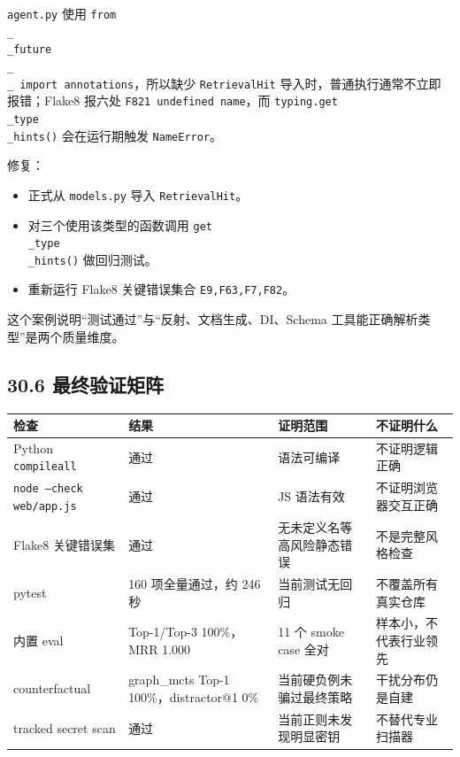 \documentclass[UTF8,12pt,openany]{ctexbook}
\begin{document}
\texttt{agent.py} 使用 \texttt{from \\_\\_future\\_\\_ import annotations}，所以缺少 \texttt{RetrievalHit} 导入时，普通执行通常不立即报错；Flake8 报六处 \texttt{F821 undefined name}，而 \texttt{typing.get\\_type\\_hints()} 会在运行期触发 \texttt{NameError}。\par

修复：\par

\begin{itemize}
\item 正式从 \texttt{models.py} 导入 \texttt{RetrievalHit}。
\item 对三个使用该类型的函数调用 \texttt{get\\_type\\_hints()} 做回归测试。
\item 重新运行 Flake8 关键错误集合 \texttt{E9,F63,F7,F82}。
\end{itemize}

这个案例说明“测试通过”与“反射、文档生成、DI、Schema 工具能正确解析类型”是两个质量维度。\par

\subsection{30.6 最终验证矩阵}

\begin{center}
\small
\begin{longtable}{|p{}|p{}|p{}|p{}|}
\toprule
检查 & 结果 & 证明范围 & 不证明什么 \\
\midrule
Python \texttt{compileall} & 通过 & 语法可编译 & 不证明逻辑正确 \\
\texttt{node --check web/app.js} & 通过 & JS 语法有效 & 不证明浏览器交互正确 \\
Flake8 关键错误集 & 通过 & 无未定义名等高风险静态错误 & 不是完整风格检查 \\
pytest & 160 项全量通过，约 246 秒 & 当前测试无回归 & 不覆盖所有真实仓库 \\
内置 eval & Top-1/Top-3 100\%，MRR 1.000 & 11 个 smoke case 全对 & 样本小，不代表行业领先 \\
counterfactual & graph\_mcts Top-1 100\%，distractor@1 0\% & 当前硬负例未骗过最终策略 & 干扰分布仍是自建 \\
tracked secret scan & 通过 & 当前正则未发现明显密钥 & 不替代专业扫描器 \\
\bottomrule
\end{longtable}
\end{center}
\end{document}
